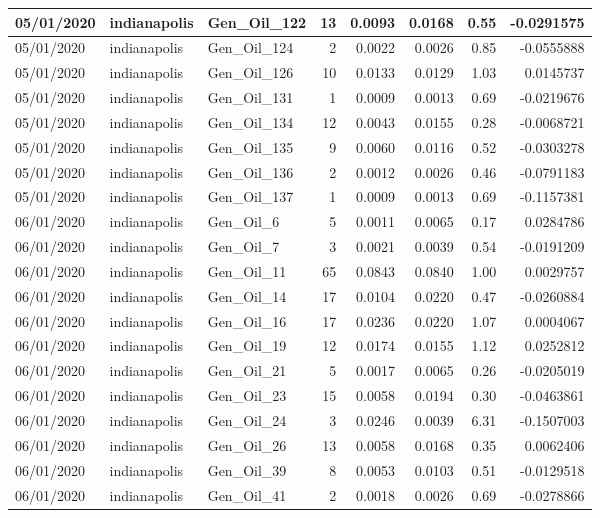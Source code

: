 \documentclass[
  letterpaper,
  DIV=11,
  numbers=noendperiod]{scrartcl}
\begin{document}
\begin{tabular}{l|l|l|r|r|r|r|r}
\hline
05/01/2020 & indianapolis & Gen\_Oil\_122 & 13 & 0.0093 & 0.0168 & 0.55 & -0.0291575\\
\hline
05/01/2020 & indianapolis & Gen\_Oil\_124 & 2 & 0.0022 & 0.0026 & 0.85 & -0.0555888\\
\hline
05/01/2020 & indianapolis & Gen\_Oil\_126 & 10 & 0.0133 & 0.0129 & 1.03 & 0.0145737\\
\hline
05/01/2020 & indianapolis & Gen\_Oil\_131 & 1 & 0.0009 & 0.0013 & 0.69 & -0.0219676\\
\hline
05/01/2020 & indianapolis & Gen\_Oil\_134 & 12 & 0.0043 & 0.0155 & 0.28 & -0.0068721\\
\hline
05/01/2020 & indianapolis & Gen\_Oil\_135 & 9 & 0.0060 & 0.0116 & 0.52 & -0.0303278\\
\hline
05/01/2020 & indianapolis & Gen\_Oil\_136 & 2 & 0.0012 & 0.0026 & 0.46 & -0.0791183\\
\hline
05/01/2020 & indianapolis & Gen\_Oil\_137 & 1 & 0.0009 & 0.0013 & 0.69 & -0.1157381\\
\hline
06/01/2020 & indianapolis & Gen\_Oil\_6 & 5 & 0.0011 & 0.0065 & 0.17 & 0.0284786\\
\hline
06/01/2020 & indianapolis & Gen\_Oil\_7 & 3 & 0.0021 & 0.0039 & 0.54 & -0.0191209\\
\hline
06/01/2020 & indianapolis & Gen\_Oil\_11 & 65 & 0.0843 & 0.0840 & 1.00 & 0.0029757\\
\hline
06/01/2020 & indianapolis & Gen\_Oil\_14 & 17 & 0.0104 & 0.0220 & 0.47 & -0.0260884\\
\hline
06/01/2020 & indianapolis & Gen\_Oil\_16 & 17 & 0.0236 & 0.0220 & 1.07 & 0.0004067\\
\hline
06/01/2020 & indianapolis & Gen\_Oil\_19 & 12 & 0.0174 & 0.0155 & 1.12 & 0.0252812\\
\hline
06/01/2020 & indianapolis & Gen\_Oil\_21 & 5 & 0.0017 & 0.0065 & 0.26 & -0.0205019\\
\hline
06/01/2020 & indianapolis & Gen\_Oil\_23 & 15 & 0.0058 & 0.0194 & 0.30 & -0.0463861\\
\hline
06/01/2020 & indianapolis & Gen\_Oil\_24 & 3 & 0.0246 & 0.0039 & 6.31 & -0.1507003\\
\hline
06/01/2020 & indianapolis & Gen\_Oil\_26 & 13 & 0.0058 & 0.0168 & 0.35 & 0.0062406\\
\hline
06/01/2020 & indianapolis & Gen\_Oil\_39 & 8 & 0.0053 & 0.0103 & 0.51 & -0.0129518\\
\hline
06/01/2020 & indianapolis & Gen\_Oil\_41 & 2 & 0.0018 & 0.0026 & 0.69 & -0.0278866\\

\end{tabular}
\end{document}

